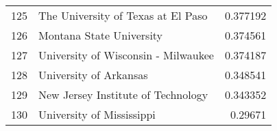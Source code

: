 \begin{tabular}{rlr}
 125 & The University of Texas at El Paso                             &  0.377192 \\
 126 & Montana State University                                       &  0.374561 \\
 127 & University of Wisconsin - Milwaukee                            &  0.374187 \\
 128 & University of Arkansas                                         &  0.348541 \\
 129 & New Jersey Institute of Technology                             &  0.343352 \\
 130 & University of Mississippi                                      &  0.29671  \\
\hline
\end{tabular}
